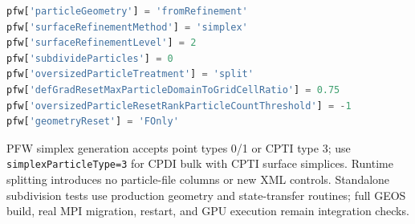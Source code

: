 \begin{lstlisting}[language=Python,caption={Native surface geometry with runtime size control.}]
pfw['particleGeometry'] = 'fromRefinement'
pfw['surfaceRefinementMethod'] = 'simplex'
pfw['surfaceRefinementLevel'] = 2
pfw['subdivideParticles'] = 0
pfw['oversizedParticleTreatment'] = 'split'
pfw['defGradResetMaxParticleDomainToGridCellRatio'] = 0.75
pfw['oversizedParticleResetRankParticleCountThreshold'] = -1
pfw['geometryReset'] = 'FOnly'
\end{lstlisting}
PFW simplex generation accepts point types 0/1 or CPTI type 3; use
\texttt{simplexParticleType=3} for CPDI bulk with CPTI surface simplices. Runtime splitting introduces no particle-file columns or
new XML controls. Standalone subdivision tests use production geometry and state-transfer routines; full GEOS build, real MPI migration, restart, and GPU execution remain integration checks.
